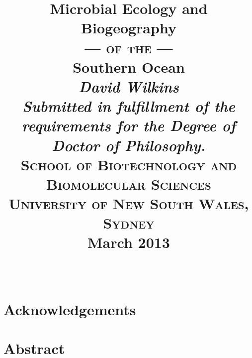 \documentclass[a4paper]{book}
\begin{document}
\date{}
\title{
  \bigskip
  \Huge{Microbial Ecology and Biogeography}\\ \medskip \vspace{1 mm} \smallskip \smallskip \Large{\textsc{--- of the ---}}\\ \medskip \Huge{Southern Ocean}\\
  \bigskip
  \bigskip
  \bigskip
  \bigskip
  \bigskip
  \bigskip
  \bigskip
  \bigskip
  \huge{\textit{David Wilkins}}
  \vfill
  \small{
    \large{\adfdoubleflourishright}\\
    \smallskip
    \textit{Submitted in fulfillment of the requirements for the Degree of Doctor of Philosophy.}\\
    \medskip
    \textsc{School of Biotechnology and Biomolecular Sciences\\
    University of New South Wales, Sydney}\\
    \medskip
    \large{\textbf{March 2013}}\\
    \smallskip
    \large{\adfdoubleflourishright}\\
  }
  \medskip
}

\maketitle


\tableofcontents

\listoffigures
{}

\listoftables
{}

\singlespacing
\printglossary[type=\acronymtype]

\chapter{Acknowledgements}

\chapter{Abstract}

\clearpage
{}

\glsresetall


\glsresetall


\glsresetall


\glsresetall


\singlespacing


\end{document}

